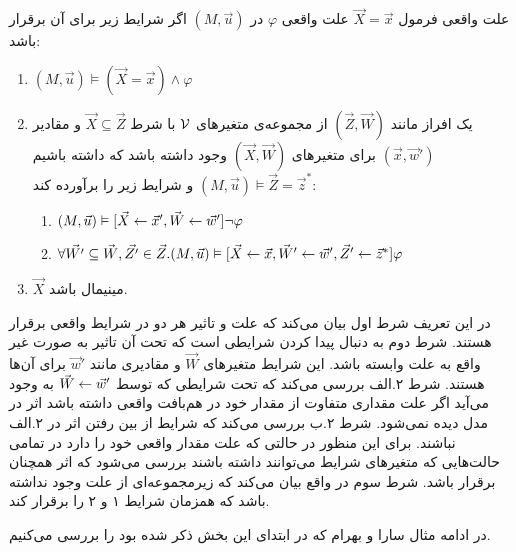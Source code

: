 \begin{definition}{علت واقعی}
    فرمول
    $\vec X = \vec x$
    علت واقعی
    $\varphi$
    در
    $(M,\vec{u})$
    اگر شرایط زیر برای آن برقرار باشد:
    \begin{enumerate}
        \item $(M,\vec{u}) \vDash (\vec{X} = \vec{x}) \wedge \varphi$
        \item یک افراز مانند
              $(\vec{Z},\vec{W})$
              از مجموعه‌ی متغیر‌های
              $\mathcal{V}$
              با شرط
              $\vec{X} \subseteq \vec{Z}$
              و مقادیر
              $(\vec{x},\vec{w}')$
              برای متغیر‌های
              $(\vec{X},\vec{W})$
              وجود داشته باشد که داشته باشیم
              $(M,\vec{u})\vDash \vec{Z} = \vec{z}^*$
              و شرایط زیر را برآورده کند:
              \begin{enumerate}
                  \item $(M,\vec u)\vDash[\vec{X}\leftarrow\vec{x}',\vec{W}\leftarrow\vec{w}']
                            \neg \varphi$
                  \item $\forall \vec{W'} \subseteq \vec{W},\vec{Z'}\in \vec{Z}.
                            (M,\vec{u})\vDash [\vec X\leftarrow\vec x,\vec{W}'\leftarrow \vec{w}',\vec{Z}'\leftarrow \vec{z}^*]\varphi$
              \end{enumerate}
        \item $\vec X$
              مینیمال باشد.
    \end{enumerate}
\end{definition}
در این تعریف شرط اول بیان می‌کند که علت و تاثیر هر دو در شرایط واقعی برقرار هستند.
شرط دوم به دنبال پیدا کردن شرایطی است که تحت آن تاثیر به صورت غیر واقع به علت وابسته باشد.
این شرایط متغیرهای
$\vec W$
و مقادیری مانند
$\vec{w}'$
برای آن‌ها هستند.
شرط ۲.الف بررسی می‌کند که تحت شرایطی که توسط
$\vec W \leftarrow \vec{w}'$
به وجود می‌آید اگر علت مقداری متفاوت از مقدار خود در هم‌بافت واقعی داشته باشد اثر در مدل دیده نمی‌شود.
شرط ۲.ب بررسی می‌کند که شرایط از بین رفتن اثر در ۲.الف نباشند.
برای این منظور در حالتی که علت مقدار واقعی خود را دارد در تمامی حالت‌هایی که متغیر‌های شرایط می‌توانند داشته باشند بررسی می‌شود که اثر همچنان برقرار باشد.
شرط سوم در واقع بیان می‌کند که زیرمجموعه‌ای از علت وجود نداشته باشد که همزمان شرایط ۱ و ۲ را برقرار کند.

در ادامه مثال سارا و بهرام که در ابتدای این بخش ذکر شده بود را بررسی می‌کنیم.

